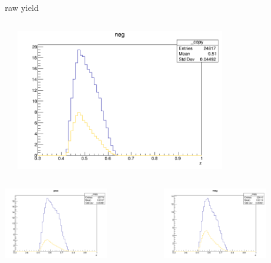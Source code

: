 \begin{frame}{raw yield}
\begin{columns}
\begin{column}[T]{0.25\textwidth}
\end{column}
\begin{column}[T]{0.25\textwidth}
\includegraphics[width = 0.7\textwidth]{results/yield/statistics/yield_x_Q2_z_0.35_4.000_0.50_neg.png}
\end{column}
\end{columns}
\begin{columns}
\begin{column}[T]{0.25\textwidth}
\includegraphics[width = 0.7\textwidth]{results/yield/statistics/yield_x_Q2_z_0.35_4.000_0.60_pos.png}
\end{column}
\begin{column}[T]{0.25\textwidth}
\includegraphics[width = 0.7\textwidth]{results/yield/statistics/yield_x_Q2_z_0.35_4.000_0.60_neg.png}

\end{column}
\end{columns}
\end{frame}
